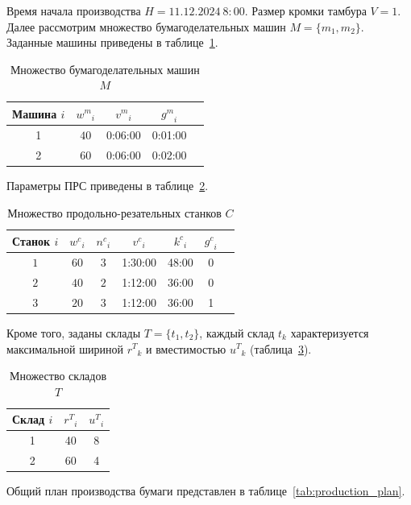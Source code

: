 Время начала производства $H=11.12.2024\ 8:00$.
Размер кромки тамбура $V=1$.
Далее рассмотрим множество бумагоделательных машин $M = \{m_{1}, m_{2}\}$.
Заданные машины приведены в таблице~\ref{tab:machines}.

\begin{table}[h]
\centering
\caption{Множество бумагоделательных машин $M$}
\label{tab:machines}
\begin{tabular}{|c|c|c|c|c|}
\hline
Машина $i$ & ${w^m}_{i}$ & ${v^m}_{i}$ & ${g^m}_{i}$ \\
\hline
1 & $40$ & 0:06:00 & 0:01:00 \\
2 & $60$ & 0:06:00 & 0:02:00 \\
\hline
\end{tabular}
\end{table}

Параметры ПРС приведены в таблице~\ref{tab:cutters}.

\begin{table}[h]
\centering
\caption{Множество продольно-резательных станков $C$}
\label{tab:cutters}
\begin{tabular}{|c|c|c|c|c|c|c|}
\hline
Станок $i$ & ${w^c}_{i}$ & ${n^c}_{i}$ & ${v^c}_{i}$ & ${k^c}_{i}$ & ${g^c}_{i}$ \\
\hline
$1$ & $60$ & $3$ & 1:30:00 & 48:00 & 0 \\
$2$ & $40$ & $2$ & 1:12:00 & 36:00 & 0 \\
$3$ & $20$ & $3$ & 1:12:00 & 36:00 & 1 \\
\hline
\end{tabular}
\end{table}

Кроме того, заданы склады $T = \{t_{1}, t_{2}\}$, каждый склад $t_{k}$ характеризуется максимальной шириной ${r^T}_{k}$ и вместимостью ${u^T}_{k}$ (таблица~\ref{tab:storages}).

\begin{table}[h]
\centering
\caption{Множество складов $T$}
\label{tab:storages}
\begin{tabular}{|c|c|c|}
\hline
Склад $i$ & ${r^T}_{i}$ & ${u^T}_{i}$ \\
\hline
1 & 40 & 8 \\
2 & 60 & 4 \\
\hline
\end{tabular}
\end{table}

Общий план производства бумаги представлен в таблице~\ref{tab:production_plan}.


